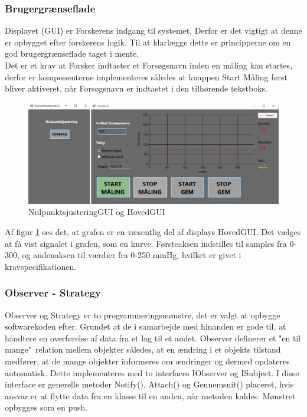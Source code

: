 \subsubsection{Brugergrænseflade}
Displayet (GUI) er Forskerens indgang til systemet. Derfor er det vigtigt at denne er opbygget efter forskerens logik. Til at klarlægge dette er principperne om en god brugergrænseflade taget i mente. \\
Det er et krav at Forsker indtaster et Forsøgsnavn inden en måling kan startes, derfor er komponenterne implementeres således at knappen Start Måling først bliver aktiveret, når Forsøgsnavn er indtastet i den tilhørende tekstboks. 
\begin{figure}[H]
	\centering
	\includegraphics[width=1.0\textwidth]{Figurer/NulHovedGUI}
	\caption{NulpunktsjusteringGUI og HovedGUI}
	\label{fig:FormsSW}
\end{figure}
Af figur \ref{fig:FormsSW} ses det, at grafen er en væsentlig del af displays HovedGUI. Det vælges at få vist signalet i grafen, som en kurve. Førsteaksen indstilles til samples fra 0-300, og andenaksen til værdier fra 0-250 mmHg, hvilket er givet i kravspecifikationen. 

\subsubsection{Observer - Strategy}
Observer og Strategy er to programmeringsmønstre, det er valgt at opbygge softwarekoden efter. Grundet at de i samarbejde med hinanden er gode til, at håndtere en overførelse af data fra et lag til et andet. Observer definerer et "en til mange"\ relation mellem objekter således, at en ændring i et objekts tilstand medfører, at de mange objekter informeres om ændringer og dermed opdateres automatisk. Dette implementeres med to interfaces IObserver og ISubject. I disse interface er generelle metoder Notify(), Attach() og Gennemsnit() placeret, hvis ansvar er at flytte data fra en klasse til en anden, når metoden kaldes. Mønstret opbygges som en push.


